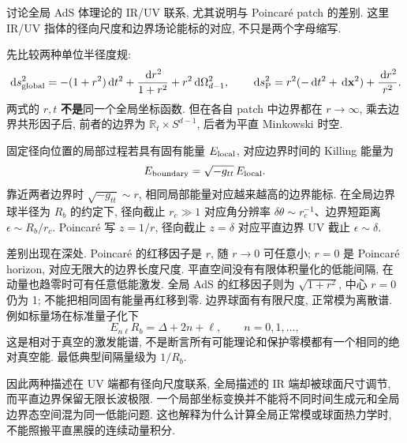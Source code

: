 \begin{exercise}
讨论全局 AdS 体理论的 IR/UV 联系, 尤其说明与 Poincaré patch 的差别. 这里 IR/UV 指体的径向尺度和边界场论能标的对应, 不只是两个字母缩写.
\end{exercise}
\begin{solution}
先比较两种单位半径度规:
\[
\,\mathrm d s^2_{\rm global}=-(1+r^2)\,\mathrm d t^2+
\frac{\,\mathrm d r^2}{1+r^2}+r^2\,\mathrm d\Omega_{d-1}^2,
\qquad
\,\mathrm d s^2_{\rm P}=r^2(-\,\mathrm d t^2+\,\mathrm d\mathbf x^2)+\frac{\,\mathrm d r^2}{r^2}.
\]
两式的 $r,t$ \textbf{不是}同一个全局坐标函数. 但在各自 patch 中边界都在 $r\to\infty$, 乘去边界共形因子后, 前者的边界为 $\mathbb R_t\times S^{d-1}$, 后者为平直 Minkowski 时空.

固定径向位置的局部过程若具有固有能量 $E_{\rm local}$, 对应边界时间的 Killing 能量为
\[
E_{\rm boundary}=\sqrt{-g_{tt}}\,E_{\rm local}.
\]
靠近两者边界时 $\sqrt{-g_{tt}}\sim r$, 相同局部能量对应越来越高的边界能标. 在全局边界球半径为 $R_b$ 的约定下, 径向截止 $r_c\gg1$ 对应角分辨率 $\delta\theta\sim r_c^{-1}$、边界短距离 $\epsilon\sim R_b/r_c$. Poincaré 写 $z=1/r$, 径向截止 $z=\delta$ 对应平直边界 UV 截止 $\epsilon\sim\delta$.

差别出现在深处. Poincaré 的红移因子是 $r$, 随 $r\to0$ 可任意小; $r=0$ 是 Poincaré horizon, 对应无限大的边界长度尺度. 平直空间没有有限体积量化的低能间隔, 在动量也趋零时可有任意低能激发. 全局 AdS 的红移因子则为 $\sqrt{1+r^2}$, 中心 $r=0$ 仍为 1; 不能把相同固有能量再红移到零. 边界球面有有限尺度, 正常模为离散谱. 例如标量场在标准量子化下
\[
E_{n\ell}R_b=\Delta+2n+\ell,\qquad n=0,1,\ldots,
\]
这是相对于真空的激发能谱, 不是断言所有可能理论和保护零模都有一个相同的绝对真空能. 最低典型间隔量级为 $1/R_b$.

因此两种描述在 UV 端都有径向尺度联系, 全局描述的 IR 端却被球面尺寸调节, 而平直边界保留无限长波极限. 一个局部坐标变换并不能将不同时间生成元和全局边界态空间混为同一低能问题. 这也解释为什么计算全局正常模或球面热力学时, 不能照搬平直黑膜的连续动量积分.
\end{solution}
